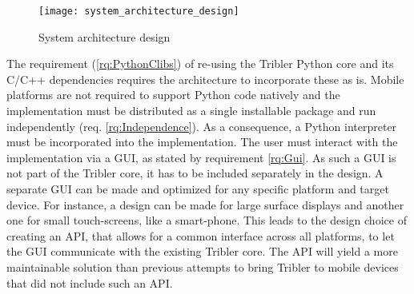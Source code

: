 \begin{figure}[H]
	\centering
	\texttt{[image: system\_architecture\_design]}
	\caption{System architecture design}
	\label{fig:system_architecture_design}
\end{figure}

The requirement (\ref{rq:PythonClibs}) of re-using the Tribler Python core and its C/C++ dependencies requires the architecture to incorporate these as is.
Mobile platforms are not required to support Python code natively and the implementation must be distributed as a single installable package and run independently (req. \ref{rq:Independence}).
As a consequence, a Python interpreter must be incorporated into the implementation.
The user must interact with the implementation via a GUI, as stated by requirement \ref{rq:Gui}.
As such a GUI is not part of the Tribler core, it has to be included separately in the design.
A separate GUI can be made and optimized for any specific platform and target device. %
For instance, a design can be made for large surface displays and another one for small touch-screens, like a smart-phone.
This leads to the design choice of creating an API, that allows for a common interface across all platforms, to let the GUI communicate with the existing Tribler core.
The API will yield a more maintainable solution than previous attempts to bring Tribler to mobile devices \cite{bsc1,2,3} that did not include such an API.

